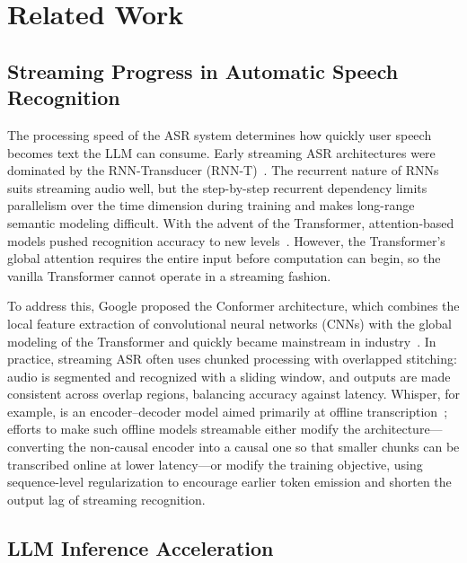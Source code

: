 \documentclass[conference]{IEEEtran}
\begin{document}
\section{Related Work}\label{sec:related}

\subsection{Streaming Progress in Automatic Speech Recognition}

The processing speed of the ASR system determines how quickly user speech becomes text the LLM can consume. Early streaming ASR architectures were dominated by the RNN-Transducer (RNN-T)~\cite{ref3}. The recurrent nature of RNNs suits streaming audio well, but the step-by-step recurrent dependency limits parallelism over the time dimension during training and makes long-range semantic modeling difficult. With the advent of the Transformer, attention-based models pushed recognition accuracy to new levels~\cite{ref4}. However, the Transformer's global attention requires the entire input before computation can begin, so the vanilla Transformer cannot operate in a streaming fashion.

To address this, Google proposed the Conformer architecture, which combines the local feature extraction of convolutional neural networks (CNNs) with the global modeling of the Transformer and quickly became mainstream in industry~\cite{ref5}. In practice, streaming ASR often uses chunked processing with overlapped stitching: audio is segmented and recognized with a sliding window, and outputs are made consistent across overlap regions, balancing accuracy against latency. Whisper, for example, is an encoder--decoder model aimed primarily at offline transcription~\cite{ref6}; efforts to make such offline models streamable either modify the architecture---converting the non-causal encoder into a causal one so that smaller chunks can be transcribed online at lower latency---or modify the training objective, using sequence-level regularization to encourage earlier token emission and shorten the output lag of streaming recognition.

\subsection{LLM Inference Acceleration}
\end{document}
